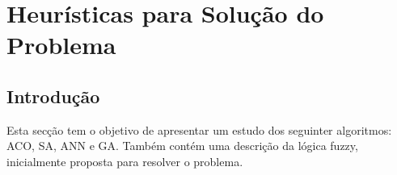 \chapter{Heurísticas para Solução do Problema}\label{cap:heuristicas}

\section{Introdução}

Esta secção tem o objetivo de apresentar um estudo dos seguinter algoritmos:
ACO, SA, ANN e GA\@. Também contém uma descrição da lógica fuzzy, inicialmente
proposta para resolver o problema.



